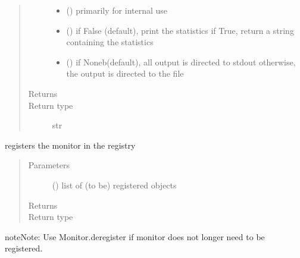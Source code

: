 \documentclass[letterpaper,10pt,english]{sphinxmanual}
\begin{document}
\begin{fulllineitems}
\begin{fulllineitems}
\begin{quote}
\begin{description}
\begin{itemize}
\item {} 
 () \textendash{} primarily for internal use

\item {} 
 () \textendash{} if False (default), print the statistics
if True, return a string containing the statistics

\item {} 
 () \textendash{} if Noneb(default), all output is directed to stdout 
otherwise, the output is directed to the file

\end{itemize}

\item[{Returns}] \leavevmode
{}

\item[{Return type}] \leavevmode
str

\end{description}\end{quote}

\end{fulllineitems}


\begin{fulllineitems}
\label{\detokenize{Reference:salabim.Monitor.register}}
registers the monitor in the registry
\begin{quote}\begin{description}
\item[{Parameters}] \leavevmode
{} () \textendash{} list of (to be) registered objects

\item[{Returns}] \leavevmode
{}

\item[{Return type}] \leavevmode
{\hyperref[\detokenize{Reference:salabim.Monitor}]{}}

\end{description}\end{quote}

\begin{sphinxadmonition}{note}{Note:}
Use Monitor.deregister if monitor does not longer need to be registered.
\end{sphinxadmonition}


\end{fulllineitems}
\end{fulllineitems}
\end{document}
